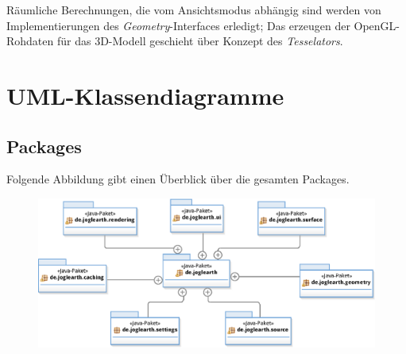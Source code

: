 \documentclass[10pt]{scrreprt}
\begin{document}
Räumliche Berechnungen, die vom Ansichtsmodus abhängig sind werden von Implementierungen des \textit{Geometry}-Interfaces erledigt; Das erzeugen der OpenGL-Rohdaten für das 3D-Modell geschieht über Konzept des \textit{Tesselators}.


\chapter{UML-Klassendiagramme}

\section{Packages}
Folgende Abbildung gibt einen Überblick über die gesamten Packages.\\

\begin{figure}[!htb]
\begin{center}
	\includegraphics[scale=0.55]{Pakete.eps}
\end{center}
\end{figure}
\end{document}
